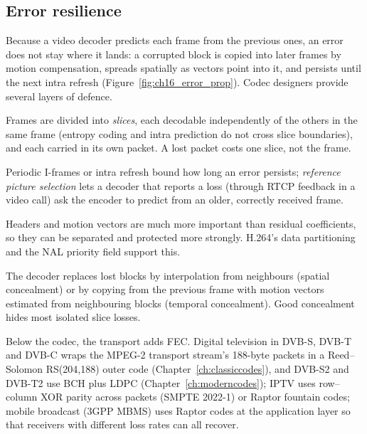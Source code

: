 \subsection{Error resilience}


Because a video decoder predicts each frame from the previous ones, an error does not stay where it
lands: a corrupted block is copied into later frames by motion compensation, spreads spatially as vectors
point into it, and persists until the next intra refresh (Figure~\ref{fig:ch16_error_prop}). Codec
designers provide several layers of defence.

\begin{description}[style=nextline,leftmargin=1.2em,font=\sffamily\bfseries\small\color{navy}]
\item[Resynchronisation.] Frames are divided into \emph{slices}, each decodable independently of the
others in the same frame (entropy coding and intra prediction do not cross slice boundaries), and each
carried in its own packet. A lost packet costs one slice, not the frame.
\item[Limiting propagation.] Periodic I-frames or intra refresh bound how long an error persists;
\emph{reference picture selection} lets a decoder that reports a loss (through RTCP feedback in a video
call) ask the encoder to predict from an older, correctly received frame.
\item[Data partitioning and prioritisation.] Headers and motion vectors are much more important than
residual coefficients, so they can be separated and protected more strongly. H.264's data partitioning
and the NAL priority field support this.
\item[Concealment.] The decoder replaces lost blocks by interpolation from neighbours (spatial
concealment) or by copying from the previous frame with motion vectors estimated from neighbouring
blocks (temporal concealment). Good concealment hides most isolated slice losses.
\item[Forward error correction.] Below the codec, the transport adds FEC. Digital television in DVB-S,
DVB-T and DVB-C wraps the MPEG-2 transport stream's 188-byte packets in a Reed--Solomon RS(204,188) outer
code (Chapter~\ref{ch:classiccodes}), and DVB-S2 and DVB-T2 use BCH plus LDPC (Chapter~\ref{ch:moderncodes});
IPTV uses row--column XOR parity across packets (SMPTE 2022-1) or Raptor fountain codes; mobile broadcast
(3GPP MBMS) uses Raptor codes at the application layer so that receivers with different loss rates can all
recover.
\end{description}

